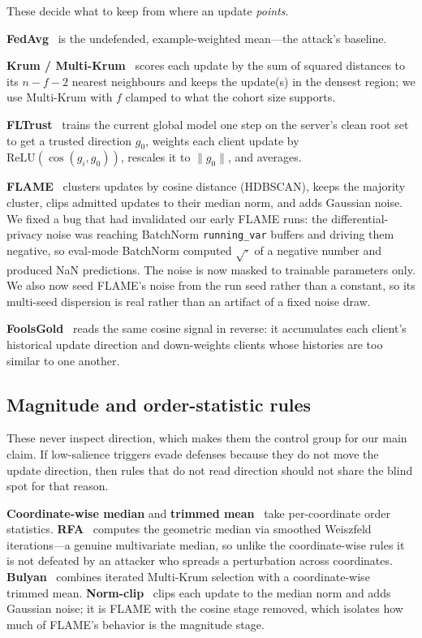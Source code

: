 These decide what to keep from where an update \emph{points}.

\textbf{FedAvg}~\cite{mcmahan2017} is the undefended, example-weighted mean---the
attack's baseline.

\textbf{Krum / Multi-Krum}~\cite{blanchard2017} scores each update by the sum of
squared distances to its $n-f-2$ nearest neighbours and keeps the update(s) in
the densest region; we use Multi-Krum with $f$ clamped to what the cohort size
supports.

\textbf{FLTrust}~\cite{cao2021fltrust} trains the current global model one step
on the server's clean root set to get a trusted direction $g_0$, weights each
client update by $\mathrm{ReLU}(\cos(g_i,g_0))$, rescales it to $\|g_0\|$, and
averages.

\textbf{FLAME}~\cite{nguyen2022flame} clusters updates by cosine distance
(HDBSCAN), keeps the majority cluster, clips admitted updates to their median
norm, and adds Gaussian noise. We fixed a bug that had invalidated our early
FLAME runs: the differential-privacy noise was reaching BatchNorm
\texttt{running\_var} buffers and driving them negative, so eval-mode BatchNorm
computed $\sqrt{\cdot}$ of a negative number and produced NaN predictions. The
noise is now masked to trainable parameters only. We also now seed FLAME's noise
from the run seed rather than a constant, so its multi-seed dispersion is real
rather than an artifact of a fixed noise draw.

\textbf{FoolsGold}~\cite{fung2020foolsgold} reads the same cosine signal in
reverse: it accumulates each client's historical update direction and
down-weights clients whose histories are too similar to one another.

\subsection{Magnitude and order-statistic rules}

These never inspect direction, which makes them the control group for our main
claim. If low-salience triggers evade defenses because they do not move the
update direction, then rules that do not read direction should not share the
blind spot for that reason.

\textbf{Coordinate-wise median} and \textbf{trimmed mean}~\cite{yin2018} take
per-coordinate order statistics. \textbf{RFA}~\cite{pillutla2022rfa} computes the
geometric median via smoothed Weiszfeld iterations---a genuine multivariate
median, so unlike the coordinate-wise rules it is not defeated by an attacker who
spreads a perturbation across coordinates. \textbf{Bulyan}~\cite{mhamdi2018bulyan}
combines iterated Multi-Krum selection with a coordinate-wise trimmed mean.
\textbf{Norm-clip}~\cite{sun2019} clips each update to the median norm and adds
Gaussian noise; it is FLAME with the cosine stage removed, which isolates how
much of FLAME's behavior is the magnitude stage.

